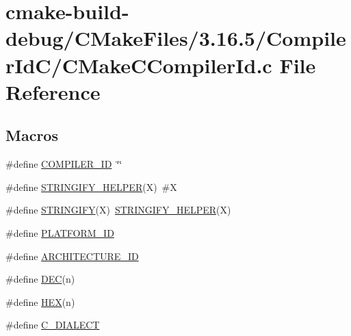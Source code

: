 \hypertarget{cmake-build-debug_2_c_make_files_23_816_85_2_compiler_id_c_2_c_make_c_compiler_id_8c}{}\section{cmake-\/build-\/debug/\+C\+Make\+Files/3.16.5/\+Compiler\+Id\+C/\+C\+Make\+C\+Compiler\+Id.c File Reference}
\label{cmake-build-debug_2_c_make_files_23_816_85_2_compiler_id_c_2_c_make_c_compiler_id_8c}
\subsection*{Macros}
\begin{DoxyCompactItemize}
\item 
\#define \hyperlink{cmake-build-debug_2_c_make_files_23_816_85_2_compiler_id_c_2_c_make_c_compiler_id_8c_a81dee0709ded976b2e0319239f72d174}{C\+O\+M\+P\+I\+L\+E\+R\+\_\+\+ID}~\char`\"{}\char`\"{}
\item 
\#define \hyperlink{cmake-build-debug_2_c_make_files_23_816_85_2_compiler_id_c_2_c_make_c_compiler_id_8c_a2ae9b72bb13abaabfcf2ee0ba7d3fa1d}{S\+T\+R\+I\+N\+G\+I\+F\+Y\+\_\+\+H\+E\+L\+P\+ER}(X)~\#X
\item 
\#define \hyperlink{cmake-build-debug_2_c_make_files_23_816_85_2_compiler_id_c_2_c_make_c_compiler_id_8c_a43e1cad902b6477bec893cb6430bd6c8}{S\+T\+R\+I\+N\+G\+I\+FY}(X)~\hyperlink{cmake-build-debug_2_c_make_files_23_816_85_2_compiler_id_c_x_x_2_c_make_c_x_x_compiler_id_8cpp_a2ae9b72bb13abaabfcf2ee0ba7d3fa1d}{S\+T\+R\+I\+N\+G\+I\+F\+Y\+\_\+\+H\+E\+L\+P\+ER}(X)
\item 
\#define \hyperlink{cmake-build-debug_2_c_make_files_23_816_85_2_compiler_id_c_2_c_make_c_compiler_id_8c_adbc5372f40838899018fadbc89bd588b}{P\+L\+A\+T\+F\+O\+R\+M\+\_\+\+ID}
\item 
\#define \hyperlink{cmake-build-debug_2_c_make_files_23_816_85_2_compiler_id_c_2_c_make_c_compiler_id_8c_aba35d0d200deaeb06aee95ca297acb28}{A\+R\+C\+H\+I\+T\+E\+C\+T\+U\+R\+E\+\_\+\+ID}
\item 
\#define \hyperlink{cmake-build-debug_2_c_make_files_23_816_85_2_compiler_id_c_2_c_make_c_compiler_id_8c_ad1280362da42492bbc11aa78cbf776ad}{D\+EC}(n)
\item 
\#define \hyperlink{cmake-build-debug_2_c_make_files_23_816_85_2_compiler_id_c_2_c_make_c_compiler_id_8c_a46d5d95daa1bef867bd0179594310ed5}{H\+EX}(n)
\item 
\#define \hyperlink{cmake-build-debug_2_c_make_files_23_816_85_2_compiler_id_c_2_c_make_c_compiler_id_8c_a07f8e5783674099cd7f5110e22a78cdb}{C\+\_\+\+D\+I\+A\+L\+E\+CT}
\end{DoxyCompactItemize}
